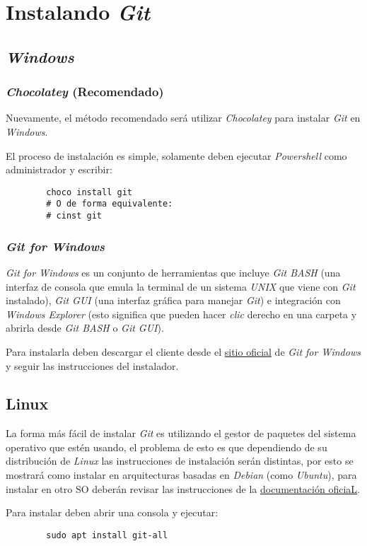\section{Instalando \textit{Git}}
 	\subsection{\textit{Windows}}
    \subsubsection{\textit{Chocolatey} (Recomendado)}
      Nuevamente, el método recomendado será utilizar \textit{Chocolatey} para 
      instalar \textit{Git} en \textit{Windows}.
      
      El proceso de instalación es simple, solamente deben ejecutar 
      \textit{Powershell} como administrador y escribir:
      \begin{verbatim}
        choco install git 
        # O de forma equivalente:
        # cinst git
      \end{verbatim}
    
    \subsubsection{\textit{Git for Windows}}
      \textit{Git for Windows} es un conjunto de herramientas que incluye \textit{Git 
      BASH} (una interfaz de consola que emula la terminal de un sistema \textit{UNIX} 
      que viene con \textit{Git} instalado), \textit{Git GUI} (una interfaz gráfica para 
      manejar \textit{Git}) e integración con \textit{Windows Explorer} (esto significa 
      que pueden hacer \textit{clic} derecho en una carpeta y abrirla desde \textit{Git 
      BASH} o \textit{Git GUI}).
      
      Para instalarla deben descargar el cliente desde el 
      \href{https://gitforwindows.org}{sitio oficial} de \textit{Git for Windows} y 
      seguir las instrucciones del instalador.

  \subsection{Linux}
      La forma más fácil de instalar \textit{Git} es utilizando el gestor de paquetes del
      sistema operativo que estén usando, el problema de esto es que dependiendo de su distribución
      de \textit{Linux} las instrucciones de instalación serán distintas, por esto se mostrará como
      instalar en arquitecturas basadas en \textit{Debian} (como \textit{Ubuntu}), para instalar en
      otro SO deberán revisar las instrucciones de la 
      \href{https://git-scm.com/download/linux}{documentación oficiaL}.

      Para instalar deben abrir una consola y ejecutar:
      \begin{verbatim}
        sudo apt install git-all 
      \end{verbatim}

